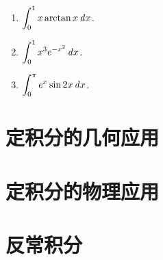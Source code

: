 \documentclass[a4paper,punct=CCT]{ctexbook}
\theoremstyle{break}
\newif\ifshowsol
\newif\ifshowex
\begin{document}
\begin{enumerate}
\item \(\displaystyle \int_0^1 x \arctan x \mathop{}\!\mathit{d} x\).

  \ifshowsol
  \[
    \begin{split}
      \int_0^1 x \arctan x \dx
      &= \frac12 \int_0^1 \arctan x \diff(x^2)
      = \frac12 \paren[\Big]{x^2 \arctan x \Big\vert_0^1 - \int_0^1 \frac{x^2}{1+x^2} \dx} \\
      &= \frac\pi8 - \frac12 + \frac12 \arctan x \Big\vert_0^1
      = \frac\pi4 - \frac12.
    \end{split}
  \]
  \fi

\item \(\displaystyle \int_0^1 x^3 e^{-x^2} \mathop{}\!\mathit{d} x\).

  \ifshowsol
  \[
    \begin{split}
      \int_0^1 x^3 e^{-x^2} \dx
      &= - \frac12 \int_0^1 x^2 \diff e^{-x^2}
      = - \frac12 \paren[\Big]{x^2 e^{-x^2} \Big\vert_0^1 - \int_0^1 e^{-x^2} \cdot 2x \dx} \\
      &= - \frac12 \paren[\Big]{e^{-1} + e^{-x^2} \Big\vert_0^1}
      = \frac12 - \frac1e.
    \end{split}
  \]
  \fi

\item \(\displaystyle \int_0^\pi e^x \sin 2x \mathop{}\!\mathit{d} x\).

  \ifshowsol
  因为
  \[
    \begin{split}
      \int_0^\pi e^x \sin 2x \dx
      &= e^x \sin 2x \Big\vert_0^\pi - 2 \int_0^\pi e^x \cos 2x \dx
      = -2 \paren[\Big]{e^x \cos 2x \Big\vert_0^\pi + 2 \int_0^\pi e^x \sin 2x \dx} \\
      &= -2(e^\pi - 1) - 4 \int_0^\pi e^x \sin 2x \dx.
    \end{split}
  \]
  所以
  \[
    \int_0^\pi e^x \sin 2x \dx = -\frac25 (e^\pi - 1).
  \]
  \fi
\end{enumerate}
\fi

\section{定积分的几何应用}

\ifshowex
\subpdfbookmark{练习}{B1.7.5.E}
\subsection*{练习}
\fi


\section{定积分的物理应用}

\section{反常积分}

\ifshowex
\subpdfbookmark{练习}{B1.7.7.E}
\subsection*{练习}
\fi
\end{document}
